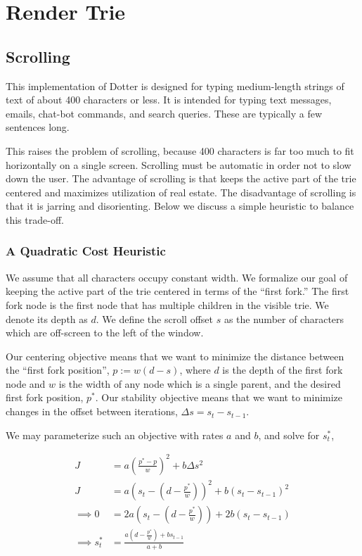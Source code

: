 \chapter{Render Trie}
\label{chap:render-trie}

\section{Scrolling}
This implementation of Dotter is designed for typing 
 medium-length strings of text of about 400 characters or less.
It is intended for typing text messages, emails, chat-bot commands,
and search queries. These are typically a few sentences long.

This raises the problem of scrolling, because 400 characters
is far too much to fit horizontally on a single screen.
Scrolling must be automatic in order not to slow down the user.
The advantage of scrolling is that keeps the active part of the trie
centered and maximizes utilization of real estate. The disadvantage
of scrolling is that it is jarring and disorienting. Below we discuss a simple
heuristic to balance this trade-off.

\subsection{A Quadratic Cost Heuristic}

We assume that all characters occupy constant width.
We formalize our goal of keeping the active part of the trie centered
in terms of the ``first fork.'' The first fork node is the first node
that has multiple children in the visible trie. We denote its depth
as $d$. We define the scroll offset $s$ as the number of characters
which are off-screen to the left of the window.

Our centering objective means that we want to 
minimize the distance between the
``first fork position'', $p := w(d - s)$, where $d$ is the depth of the first fork node and $w$ is the width of any node which is a single parent, and the desired first fork position, $p^*$.
Our stability objective means that we want to minimize 
changes in the offset between iterations, $\Delta s = s_t - s_{t-1}$.

We may parameterize such an objective with rates $a$ and $b$,
and solve for $s_t^*$,

\begin{align*}
    J &= a (\frac{p^* - p}{w})^2 + b \Delta s^2 \\
    J &= a (s_t - (d - \frac{p^*}{w}))^2 + b (s_t - s_{t-1})^2 \\
    \implies 0 &= 2a (s_t - (d - \frac{p^*}{w})) + 2b (s_t - s_{t-1}) \\
    \implies s_t^* &= \frac{a (d - \frac{p^*}{w}) + b s_{t-1}}{a + b}
\end{align*}


